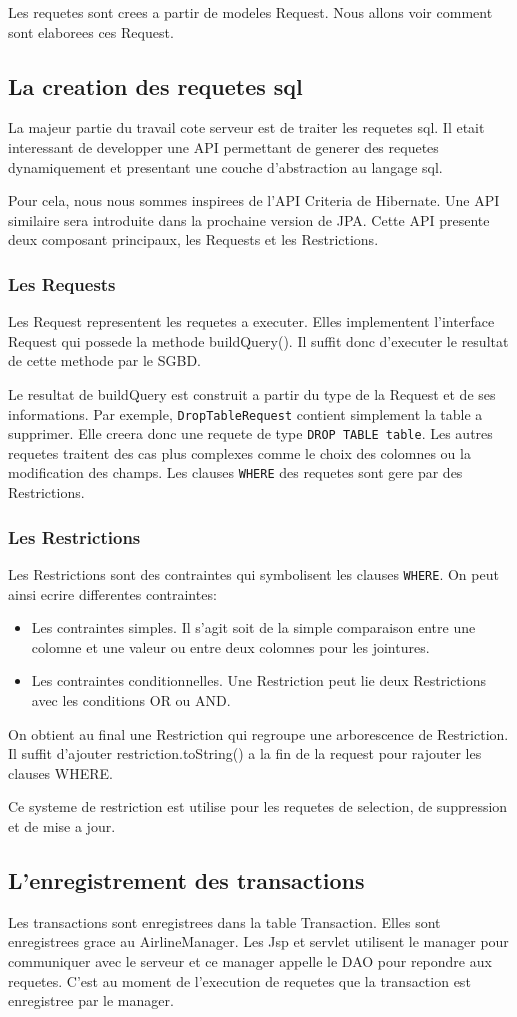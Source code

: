 Les requetes sont crees a partir de modeles Request. Nous allons voir comment sont elaborees ces Request.
\subsection{La creation des requetes sql}
La majeur partie du travail cote serveur est de traiter les requetes sql. Il etait interessant de developper une API permettant de generer des requetes dynamiquement et presentant une couche d'abstraction au langage sql.

Pour cela, nous nous sommes inspirees de l'API Criteria de Hibernate. Une API similaire sera introduite dans la prochaine version de JPA. Cette API presente deux composant principaux, les Requests et les Restrictions.
\subsubsection{Les Requests}
Les Request representent les requetes a executer. Elles implementent l'interface Request qui possede la methode buildQuery(). Il suffit donc d'executer le resultat de cette methode par le SGBD.

Le resultat de buildQuery est construit a partir du type de la Request et de ses informations. Par exemple, \texttt{DropTableRequest} contient simplement la table a supprimer. Elle creera donc une requete de type \texttt{DROP TABLE table}. Les autres requetes traitent des cas plus complexes comme le choix des colomnes ou la modification des champs. 
Les clauses \texttt{WHERE} des requetes sont gere par des Restrictions.
\subsubsection{Les Restrictions}
Les Restrictions sont des contraintes qui symbolisent les clauses \texttt{WHERE}. On peut ainsi ecrire differentes contraintes:
\begin{itemize}
 \item Les contraintes simples. Il s'agit soit de la simple comparaison entre une colomne et une valeur ou entre deux colomnes pour les jointures.
 \item Les contraintes conditionnelles. Une Restriction peut lie deux Restrictions avec les conditions OR ou AND.
\end{itemize}
On obtient au final une Restriction qui regroupe une arborescence de Restriction. Il suffit d'ajouter restriction.toString() a la fin de la request pour rajouter les clauses WHERE. 

Ce systeme de restriction est utilise pour les requetes de selection, de suppression et de mise a jour.
\subsection{L'enregistrement des transactions}
Les transactions sont enregistrees dans la table Transaction. Elles sont enregistrees grace au AirlineManager. Les Jsp et servlet utilisent le manager pour communiquer avec le serveur et ce manager appelle le DAO pour repondre aux requetes. C'est au moment de l'execution de requetes que la transaction est enregistree par le manager.